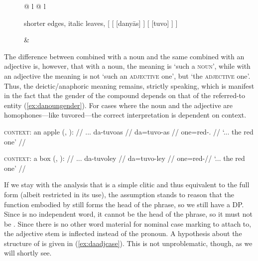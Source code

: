 \begin{figure}
\ex\label{ex:danyaastuvo} %
\begin{tabular}[t]{@{} l @{\quad} l}
\tl\quad\begin{forest} shorter edges, italic leaves,
[{}
		[\anno{\xhead{D}}
			[danyās]
		]
		[{\anno[\elem{\Adjc}]{AP}}
			[tuvo]
		]
]
\end{forest}

&

\tl\quad\label{ex:danyaastuvoavm} 

\end{tabular}
\xe
\end{figure}

The difference between  combined with a noun and the same
combined with an adjective is, however, that with a noun, the meaning is `such
a \textsc{noun}', while with an adjective the meaning is not `such an
\textsc{adjective} one', but `the \textsc{adjective} one'. Thus, the
deictic/anaphoric meaning remains, strictly speaking, which is manifest in the
fact that the gender of the compound depends on that of the referred-to entity
(\ref{ex:danoungender}). For cases where the noun and the adjective are
homophones---like  {tuvo}{red}---the correct interpretation is
dependent on context.

\pex\label{ex:danoungender}
\a\begingl
	\glpreamble \textsc{context:} an apple (, \An{}): //
	\gla ... da-tuvoas //
	\glb {} da=tuvo-as //
	\glc {} one=red-\Parg{}.\An{} //
	\glft `... the red one' // 
\endgl

\a\begingl
	\glpreamble \textsc{context:} a box (, \Inan{}): //
	\gla ... da-tuvoley //
	\glb {} da=tuvo-ley //
	\glc {} one=red-\PargI //
	\glft `... the red one' // 
\endgl
\xe

If we stay with the analysis that  is a simple clitic and thus
equivalent to the full form  (albeit restricted in its use),
the assumption stands to reason that the function embodied by 
still forms the head of the phrase, so we still have a DP. Since 
is no independent word, it cannot be the head of the phrase, so it must not be
. Since there is no other word material for nominal case marking to
attach to, the adjective stem is inflected instead of the pronoun. A hypothesis
about the structure of  is given in
(\ref{ex:daadjcase}). This is not unproblematic, though, as we will shortly
see.

